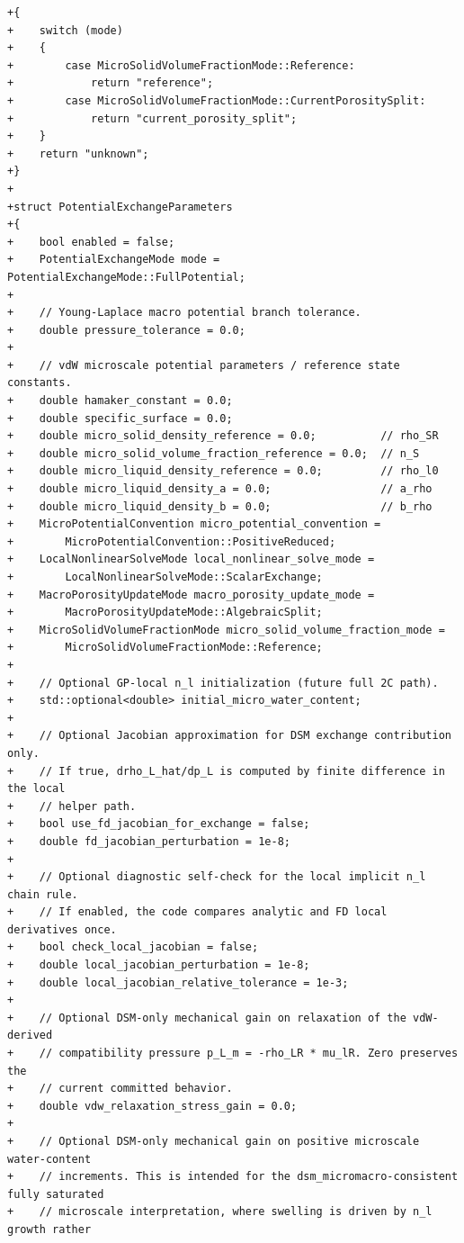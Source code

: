 \documentclass[10pt]{article}
\begin{document}
\begin{lstlisting}
+{
+    switch (mode)
+    {
+        case MicroSolidVolumeFractionMode::Reference:
+            return "reference";
+        case MicroSolidVolumeFractionMode::CurrentPorositySplit:
+            return "current_porosity_split";
+    }
+    return "unknown";
+}
+
+struct PotentialExchangeParameters
+{
+    bool enabled = false;
+    PotentialExchangeMode mode = PotentialExchangeMode::FullPotential;
+
+    // Young-Laplace macro potential branch tolerance.
+    double pressure_tolerance = 0.0;
+
+    // vdW microscale potential parameters / reference state constants.
+    double hamaker_constant = 0.0;
+    double specific_surface = 0.0;
+    double micro_solid_density_reference = 0.0;          // rho_SR
+    double micro_solid_volume_fraction_reference = 0.0;  // n_S
+    double micro_liquid_density_reference = 0.0;         // rho_l0
+    double micro_liquid_density_a = 0.0;                 // a_rho
+    double micro_liquid_density_b = 0.0;                 // b_rho
+    MicroPotentialConvention micro_potential_convention =
+        MicroPotentialConvention::PositiveReduced;
+    LocalNonlinearSolveMode local_nonlinear_solve_mode =
+        LocalNonlinearSolveMode::ScalarExchange;
+    MacroPorosityUpdateMode macro_porosity_update_mode =
+        MacroPorosityUpdateMode::AlgebraicSplit;
+    MicroSolidVolumeFractionMode micro_solid_volume_fraction_mode =
+        MicroSolidVolumeFractionMode::Reference;
+
+    // Optional GP-local n_l initialization (future full 2C path).
+    std::optional<double> initial_micro_water_content;
+
+    // Optional Jacobian approximation for DSM exchange contribution only.
+    // If true, drho_L_hat/dp_L is computed by finite difference in the local
+    // helper path.
+    bool use_fd_jacobian_for_exchange = false;
+    double fd_jacobian_perturbation = 1e-8;
+
+    // Optional diagnostic self-check for the local implicit n_l chain rule.
+    // If enabled, the code compares analytic and FD local derivatives once.
+    bool check_local_jacobian = false;
+    double local_jacobian_perturbation = 1e-8;
+    double local_jacobian_relative_tolerance = 1e-3;
+
+    // Optional DSM-only mechanical gain on relaxation of the vdW-derived
+    // compatibility pressure p_L_m = -rho_LR * mu_lR. Zero preserves the
+    // current committed behavior.
+    double vdw_relaxation_stress_gain = 0.0;
+
+    // Optional DSM-only mechanical gain on positive microscale water-content
+    // increments. This is intended for the dsm_micromacro-consistent fully saturated
+    // microscale interpretation, where swelling is driven by n_l growth rather

\end{lstlisting}
\end{document}
